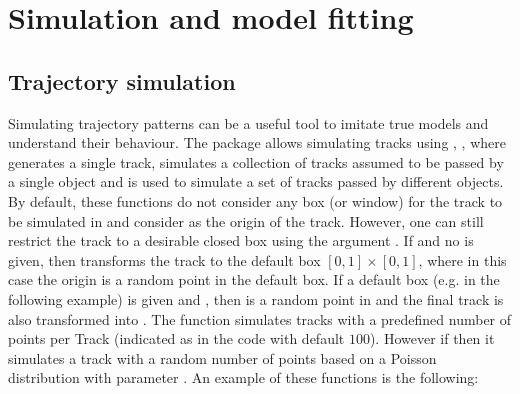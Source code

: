 \documentclass[article]{jss}
\begin{document}
\section{Simulation and model fitting}\label{simandfitt}
  \subsection{Trajectory simulation}
  Simulating trajectory patterns can be a useful tool to imitate true models and understand their behaviour. The package  allows simulating tracks using , ,  where  generates a single track,  simulates a collection of tracks assumed to be passed by a single object and  is used to simulate a set of tracks passed by different objects. By default, these functions do not consider any box (or window) for the track to be simulated in and consider  as the origin of the track. However, one can still restrict the track to a desirable closed box using the argument . If  and no  is given, then  transforms the track to the default box $[0,1]\times [0,1]$, where in this case the origin is a random point in the default box. If a default box  (e.g.  in the following example) is given and , then  is a random point in  and the final track is also transformed into . The function  simulates tracks with a predefined number of points per Track (indicated as  in the code with default $100$). However if  then it simulates a track with a random number of points based on a Poisson distribution with parameter . An example of these functions is the following:
\end{document}
